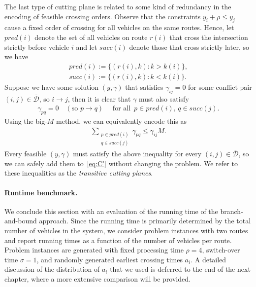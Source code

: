 \documentclass[a4paper]{report}
\theoremstyle{definition}
\theoremstyle{plain}
\begin{document}
The last type of cutting plane is related to some kind of redundancy in the
encoding of feasible crossing orders.
%
Observe that the constraints $y_i + \rho \leq y_j$ cause a fixed order of
crossing for all vehicles on the same routes. Hence, let $\mathit{pred}(i)$
denote the set of all vehicles on route $r(i)$ that cross the intersection
strictly before vehicle $i$ and let $\mathit{succ}(i)$ denote those that cross
strictly later, so we have
\begin{align*}
  \mathit{pred}(i) := \{ (r(i), k) : k > k(i) \} , \\
  \mathit{succ}(i) := \{ (r(i), k) : k < k(i) \} .
\end{align*}
%
Suppose we have some solution $(y,\gamma)$ that satisfies $\gamma_{ij} = 0$ for
some conflict pair $(i,j) \in \bar{\mathcal{D}}$, so $i \rightarrow j$, then it is
clear that $\gamma$ must also satisfy
\begin{align*}
  \gamma_{pq} = 0 \quad (\text{so } p \rightarrow q) \quad \text{ for all } \, p \in \mathit{pred}(i), \, q \in \mathit{succ}(j) .
\end{align*}
Using the big-$M$ method, we can equivalently encode this as
\begin{align}
  \sum_{\substack{p \in \mathit{pred}(i)\\ q \in \mathit{succ}(j)}} \gamma_{pq} \leq \gamma_{ij} M . \tag{trans.cut}
\end{align}
Every feasible $(y,\gamma)$ must satisfy the above inequality for every
$(i,j) \in \bar{\mathcal{D}}$, so we can safely add them to~\eqref{eq:C'}
without changing the problem. We refer to these inequalities as the
\emph{transitive cutting planes}.

\paragraph{Runtime benchmark.}

We conclude this section with an evaluation of the running time of the
branch-and-bound approach.
%
Since the running time is primarily determined by the total number of vehicles
in the system, we consider problem instances with two routes and report
running times as a function of the number of vehicles per route.
%
Problem instances are generated with fixed processing time $\rho=4$, switch-over
time $\sigma=1$, and randomly generated earliest crossing times $a_i$.
%
A detailed discussion of the distribution of $a_i$ that we used is deferred to
the end of the next chapter, where a more extensive comparison will be provided.
\end{document}
